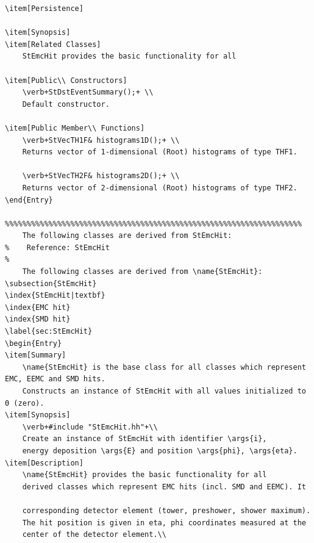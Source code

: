 {\begin{verbatim}
\item[Persistence]
    
\item[Synopsis] 
\item[Related Classes]
    StEmcHit provides the basic functionality for all
    
\item[Public\\ Constructors]
    \verb+StDstEventSummary();+ \\
    Default constructor.

\item[Public Member\\ Functions]
    \verb+StVecTH1F& histograms1D();+ \\
    Returns vector of 1-dimensional (Root) histograms of type THF1.

    \verb+StVecTH2F& histograms2D();+ \\
    Returns vector of 2-dimensional (Root) histograms of type THF2.
\end{Entry}
    
%%%%%%%%%%%%%%%%%%%%%%%%%%%%%%%%%%%%%%%%%%%%%%%%%%%%%%%%%%%%%%%%%%%%
    The following classes are derived from StEmcHit: 
%    Reference: StEmcHit
%
    The following classes are derived from \name{StEmcHit}: 
\subsection{StEmcHit}
\index{StEmcHit|textbf}
\index{EMC hit}
\index{SMD hit}
\label{sec:StEmcHit}
\begin{Entry}
\item[Summary]
    \name{StEmcHit} is the base class for all classes which represent EMC, EEMC and SMD hits.
    Constructs an instance of StEmcHit with all values initialized to 0 (zero).
\item[Synopsis]
    \verb+#include "StEmcHit.hh"+\\
    Create an instance of StEmcHit with identifier \args{i},
    energy deposition \args{E} and position \args{phi}, \args{eta}.
\item[Description]
    \name{StEmcHit} provides the basic functionality for all
    derived classes which represent EMC hits (incl. SMD and EEMC). It
    
    corresponding detector element (tower, preshower, shower maximum).
    The hit position is given in eta, phi coordinates measured at the
    center of the detector element.\\
    

\end{verbatim}}
